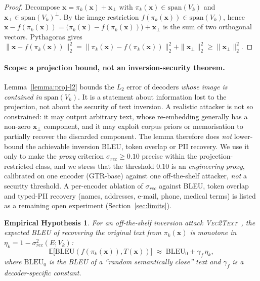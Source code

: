 \documentclass[11pt,a4paper]{article}
\newtheorem{hypothesis}{Empirical Hypothesis}
\begin{document}
\begin{proof}
Decompose $\mathbf{x} = \pi_k(\mathbf{x}) + \mathbf{x}_\perp$ with
$\pi_k(\mathbf{x}) \in \mathrm{span}(V_k)$ and
$\mathbf{x}_\perp \in \mathrm{span}(V_k)^\perp$. By the image
restriction $f(\pi_k(\mathbf{x})) \in \mathrm{span}(V_k)$, hence
$\mathbf{x} - f(\pi_k(\mathbf{x})) =
\bigl( \pi_k(\mathbf{x}) - f(\pi_k(\mathbf{x})) \bigr) + \mathbf{x}_\perp$
is the sum of two orthogonal vectors. Pythagoras gives
$\| \mathbf{x} - f(\pi_k(\mathbf{x})) \|_2^{2}
= \| \pi_k(\mathbf{x}) - f(\pi_k(\mathbf{x})) \|_2^{2}
+ \| \mathbf{x}_\perp \|_2^{2}
\geq \| \mathbf{x}_\perp \|_2^{2}$.
\end{proof}

\paragraph{Scope: a projection bound, not an inversion-security
theorem.} Lemma~\ref{lemma:proj-l2} bounds the $L_2$ error of decoders
\emph{whose image is contained in} $\mathrm{span}(V_k)$. It is a
statement about information lost to the projection, not about the
security of text inversion. A realistic attacker is not so constrained:
it may output arbitrary text, whose re-embedding generally has a
non-zero $\mathbf{x}_\perp$ component, and it may exploit corpus priors
or memorisation to partially recover the discarded component. The lemma
therefore does \emph{not} lower-bound the achievable inversion BLEU,
token overlap or PII recovery. We use it only to make the
\emph{proxy} criterion $\sigma_{rec} \geq 0.10$ precise within the
projection-restricted class, and we stress that the threshold $0.10$ is
an \emph{engineering proxy}, calibrated on one encoder (GTR-base) against
one off-the-shelf attacker, \emph{not} a security threshold. A
per-encoder ablation of $\sigma_{rec}$ against BLEU, token overlap and
typed-PII recovery (names, addresses, e-mail, phone, medical terms) is
listed as a remaining open experiment (Section~\ref{sec:limits}).

\begin{hypothesis}\label{hyp:bleu}
For an off-the-shelf inversion attack \textsc{Vec2Text}~\cite{ref_vec2text},
the expected BLEU of recovering the original text from
$\pi_k(\mathbf{x})$ is monotone in
$\eta_k = 1 - \sigma_{rec}^{2}(E; V_k)$:
\[
\mathbb{E}\bigl[ \mathrm{BLEU}(f(\pi_k(\mathbf{x})), T(\mathbf{x})) \bigr]
\;\approx\; \mathrm{BLEU}_0 + \gamma_f \, \eta_k,
\]
where $\mathrm{BLEU}_0$ is the BLEU of a ``random semantically close''
text and $\gamma_f$ is a decoder-specific constant.
\end{hypothesis}
\end{document}
